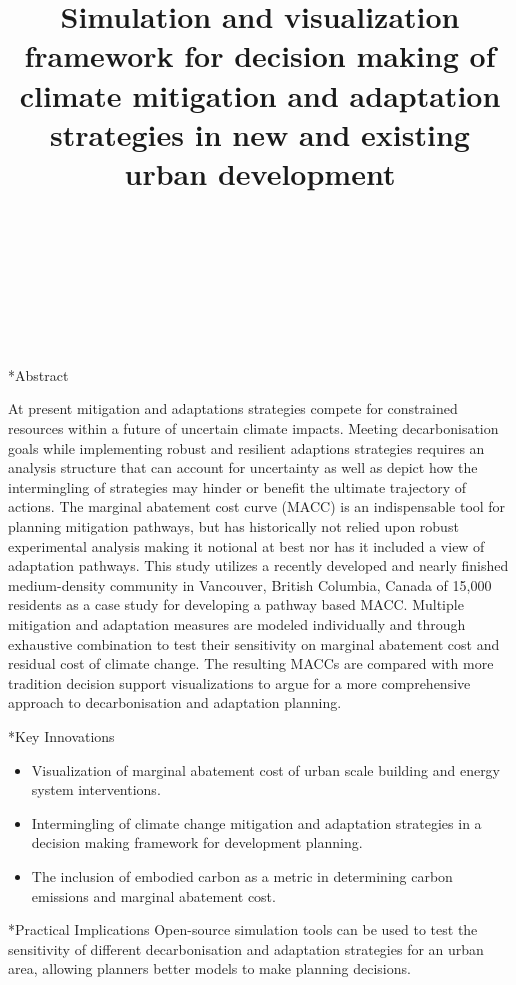 \documentclass[twocolumn, a4paper,10pt]{article}
\title{%
Simulation and visualization framework for decision making of climate mitigation  																								%
\vspace{4pt}
and adaptation strategies in new and existing urban development} 																																%
\author{																																														%
\\ 																				%
\\ 																																                                                            	%
\\ 																																                                                                %
\\ 			 			  	                                                    %
\\ 														                    	%
\phantom{Line 9}} 																																								            	%
\date{\vspace{-0.5cm}}	%
\makeatletter
\renewcommand\section{\@startsection{section}{1}{\z@}{3pt}{3pt}{\normalfont\large\bfseries}}
\makeatother
\begin{document}
\maketitle

\section*{Abstract}	%
\addtocounter{section}{1}
At present mitigation and adaptations strategies compete for constrained resources within a future of uncertain climate impacts. Meeting decarbonisation goals while implementing robust and resilient adaptions strategies requires an analysis structure that can account for uncertainty as well as depict how the intermingling of strategies may hinder or benefit the ultimate trajectory of actions. The marginal abatement cost curve (MACC) is an indispensable tool for planning mitigation pathways, but has historically not relied upon robust experimental analysis making it notional at best nor has it included a view of adaptation pathways. This study utilizes a recently developed and nearly finished medium-density community in Vancouver, British Columbia, Canada of 15,000 residents as a case study for developing a pathway based MACC. Multiple mitigation and adaptation measures are modeled individually and through exhaustive combination to test their sensitivity on marginal abatement cost and residual cost of climate change. The resulting MACCs are compared with more tradition decision support visualizations to argue for a more comprehensive approach to decarbonisation and adaptation planning. 

\section*{Key Innovations}
\begin{itemize}
\item Visualization of marginal abatement cost of urban scale building and energy system interventions.
\item Intermingling of climate change mitigation and adaptation strategies in a decision making framework for development planning.
\item The inclusion of embodied carbon as a metric in determining carbon emissions and marginal abatement cost.
\end{itemize}

\section*{Practical Implications}
Open-source simulation tools can be used to test the sensitivity of different decarbonisation and adaptation strategies for an urban area, allowing planners better models to make planning decisions. 
\end{document}
